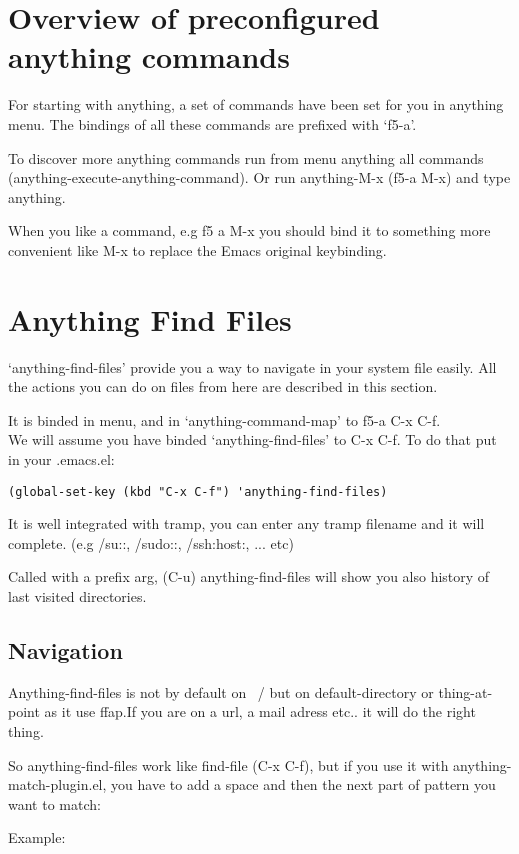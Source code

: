 \documentclass[a4paper,11pt]{article}
\begin{document}
\section{Overview of preconfigured anything commands}
\label{sec:overv-comm-avail}
For starting with anything, a set of commands have been set for you in anything menu.
The bindings of all these commands are prefixed with `f5-a'.

To discover more anything commands run from menu anything all commands (anything-execute-anything-command).
Or run anything-M-x (f5-a M-x) and type anything.

When you like a command, e.g f5 a M-x you should bind it to something more convenient like M-x to replace the Emacs
original keybinding.

\section{Anything Find Files}
\label{sec:anything-find-files}
`anything-find-files' provide you a way to navigate in your system file easily.
All the actions you can do on files from here are described in this section.

It is binded in menu, and in `anything-command-map' to f5-a C-x C-f. \\
We will assume you have binded `anything-find-files' to C-x C-f.
To do that put in your .emacs.el:
\begin{verbatim}
(global-set-key (kbd "C-x C-f") 'anything-find-files)
\end{verbatim}
It is well integrated with tramp, you can enter any tramp filename and it will complete.
(e.g /su::, /sudo::, /ssh:host:, ... etc)

Called with a prefix arg, (C-u) anything-find-files will show you also history of last visited directories.

\subsection{Navigation}
\label{sec:navigation}
Anything-find-files is not by default on ~/ but on default-directory or
thing-at-point as it use ffap.If you are on a url, a mail adress
etc.. it will do the right thing.

So anything-find-files work like find-file (C-x C-f), but if you use it
with anything-match-plugin.el, you have to add a space and then the next
part of pattern you want to match:

Example:
\end{document}
